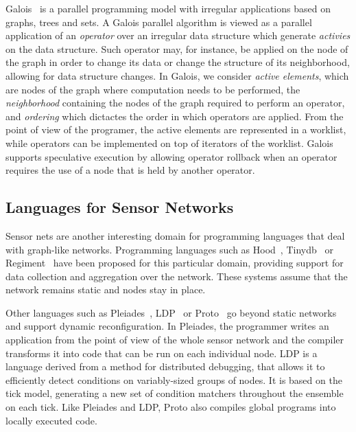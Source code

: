 Galois~\cite{Pingali:2011:TPA:1993316.1993501} is a parallel programming model
with irregular applications based on graphs, trees and sets. A Galois parallel
algorithm is viewed as a parallel application of an \emph{operator} over an
irregular data structure which generate \emph{activies} on the data structure.
Such operator may, for instance, be applied on the
node of the graph in order to change its data or change the structure of its
neighborhood, allowing for data structure changes. In Galois, we consider
\emph{active elements}, which are nodes of the graph where computation needs to
be performed, the \emph{neighborhood} containing the nodes of the graph required
to perform an operator, and \emph{ordering} which dictactes the order in which
operators are applied. From the point of view of the programer, the active
elements are represented in a worklist, while operators can be implemented on
top of iterators of the worklist. Galois supports speculative execution by
allowing operator rollback when an operator requires the use of a node that is
held by another operator.

\subsection{Languages for Sensor Networks}

Sensor nets are another interesting domain for programming languages that deal
with graph-like networks.  Programming languages such as
Hood~\cite{Whitehouse:2004:HNA:990064.990079},
Tinydb~\cite{Madden:2005:TAQ:1061318.1061322} or
Regiment~\cite{Newton:2007:RMS:1236360.1236422} have been proposed for this
particular domain, providing support for data collection and aggregation over
the network.  These systems assume that the network remains static and nodes
stay in place.

Other languages such as Pleiades~\cite{Kothari:2007:REP:1250734.1250757},
LDP~\cite{4543691} or Proto~\cite{Beal:2006:IEE:1137236.1137354} go beyond
static networks and support dynamic reconfiguration. In Pleiades, the
programmer writes an application from the point of view of the whole
sensor network and the compiler transforms it into code that can be run on
each individual node.  LDP is a language derived from a method for
distributed debugging, that allows it to efficiently detect conditions on
variably-sized groups of nodes. It is based on the tick model, generating
a new set of condition matchers throughout the ensemble on each tick.
Like Pleiades and LDP, Proto also compiles global programs into locally
executed code.

